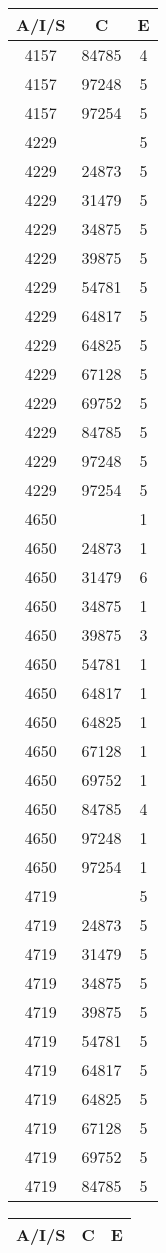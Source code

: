 {{\begin{tabular}{|c|c||c|}
        \hline
        \bf A/I/S & \bf C & \bf E \\
        \hline
4157&84785&4\\ 4157&97248&5\\ 4157&97254&5\\ 4229& &5\\ 4229&24873&5\\ 4229&31479&5\\ 4229&34875&5\\ 4229&39875&5\\ 4229&54781&5\\ 4229&64817&5\\ 4229&64825&5\\ 4229&67128&5\\ 4229&69752&5\\ 4229&84785&5\\ 4229&97248&5\\ 4229&97254&5\\ 4650& &1\\ 4650&24873&1\\ 4650&31479&6\\ 4650&34875&1\\ 4650&39875&3\\ 4650&54781&1\\ 4650&64817&1\\ 4650&64825&1\\ 4650&67128&1\\ 4650&69752&1\\ 4650&84785&4\\ 4650&97248&1\\ 4650&97254&1\\ 4719& &5\\ 4719&24873&5\\ 4719&31479&5\\ 4719&34875&5\\ 4719&39875&5\\ 4719&54781&5\\ 4719&64817&5\\ 4719&64825&5\\ 4719&67128&5\\ 4719&69752&5\\ 4719&84785&5\\ 
        \hline
        \end{tabular}
        \quad
        \begin{tabular}{|c|c||c|}
        \hline
        \bf A/I/S & \bf C & \bf E \\
        \hline

\end{tabular}}}
